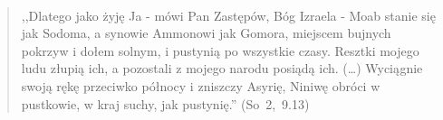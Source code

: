\documentclass[10pt,a4paper,oneside]{article}
\begin{document}
\paragraph{}
\begin{quote}
,,Dlatego jako żyję Ja - mówi Pan Zastępów, Bóg Izraela - Moab stanie się jak Sodoma, a synowie Ammonowi jak Gomora, miejscem bujnych pokrzyw i dołem solnym, i pustynią po wszystkie czasy. Resztki mojego ludu złupią ich, a pozostali z mojego narodu posiądą ich. (\ldots) Wyciągnie swoją rękę przeciwko północy i zniszczy Asyrię, Niniwę obróci w pustkowie, w kraj suchy, jak pustynię.'' \mbox{(So 2, 9.13)}
\end{quote}
\end{document}
